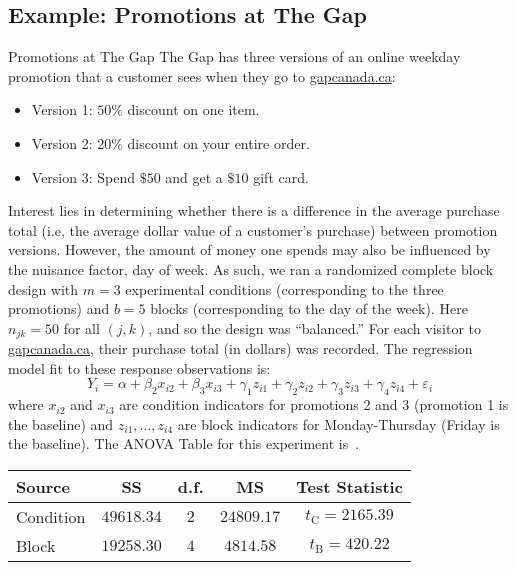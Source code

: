 \subsection{Example: Promotions at The Gap}
\begin{Example}{Promotions at The Gap}{}
    The Gap has three versions of an online weekday promotion that a customer sees when they go to \href{https://www.gapcanada.ca/}{gapcanada.ca}:
    \begin{itemize}
        \item Version 1: $ 50\% $ discount on one item.
        \item Version 2: $ 20\% $ discount on your entire order.
        \item Version 3: Spend $ \$ 50 $ and get a $ \$ 10 $ gift card.
    \end{itemize}
    Interest lies in determining whether there is a difference in the average purchase total (i.e, the average
    dollar value of a customer's purchase) between promotion versions. However, the amount of money one
    spends may also be influenced by the nuisance factor, day of week. As such, we ran a randomized complete block
    design with $m = 3$ experimental conditions (corresponding to the three promotions) and $b = 5$
    blocks (corresponding to the day of the week). Here $n_{jk}=50$ for all $(j, k)$, and so the design was ``balanced.'' For
    each visitor to \href{https://www.gapcanada.ca/}{gapcanada.ca}, their purchase total (in dollars) was recorded.
    The regression model fit to these response observations is:
    \[ Y_i=\alpha+\beta_2 x_{i2}+\beta_3 x_{i3}+\gamma_1 z_{i1}+\gamma_2 z_{i2}+\gamma_3 z_{i3}+\gamma_4 z_{i4}+\varepsilon_i \]
    where $x_{i2}$ and $x_{i3}$ are condition indicators for promotions 2 and 3 (promotion 1 is the baseline) and $ z_{i1},\ldots,z_{i4} $
    are block indicators for Monday-Thursday (Friday is the baseline). The ANOVA Table for this experiment is~.
    \begin{center}
        \captionsetup{type=table}
        \label{GAPANOVA}
        \begin{NiceTabular}{|l|c|c|c|c|}
            \toprule
            Source    & SS           & d.f.    & MS           & Test Statistic             \\
            \midrule
            Condition & $ 49618.34 $ & $ 2 $   & $ 24809.17 $ & $ t_\text{C}=2165.39 $ \\
            Block     & $ 19258.30 $ & $ 4 $   & $ 4814.58 $  & $ t_\text{B}=420.22 $  \\

\end{NiceTabular}
\end{center}
\end{Example}

